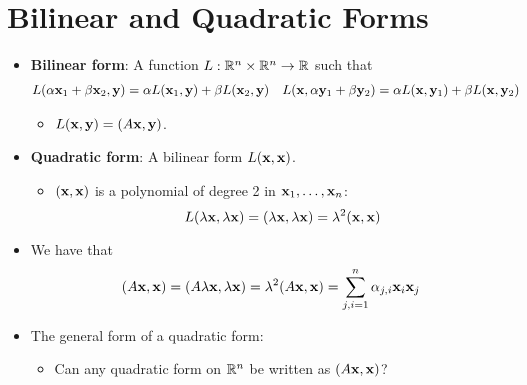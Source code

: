 \documentclass[../../notes.tex]{subfiles}
\begin{document}
\chapter{Bilinear and Quadratic Forms}
\begin{itemize}
    \item {}\textbf{Bilinear form}: A function $L:\mathbb{R}^n\times\mathbb{R}^n\to\mathbb{R}$ such that
    \begin{align*}
        L(\alpha\mathbf{x}_1+\beta\mathbf{x}_2,\mathbf{y}) &= \alpha L(\mathbf{x}_1,\mathbf{y})+\beta L(\mathbf{x}_2,\mathbf{y})&
        L(\mathbf{x},\alpha\mathbf{y}_1+\beta\mathbf{y}_2) &= \alpha L(\mathbf{x},\mathbf{y}_1)+\beta L(\mathbf{x},\mathbf{y}_2)
    \end{align*}
    \begin{itemize}
        \item $L(\mathbf{x},\mathbf{y})=(A\mathbf{x},\mathbf{y})$.
    \end{itemize}
    \item \textbf{Quadratic form}: A bilinear form $L(\mathbf{x},\mathbf{x})$.
    \begin{itemize}
        \item $(\mathbf{x},\mathbf{x})$ is a polynomial of degree 2 in $\mathbf{x}_1,\dots,\mathbf{x}_n$:
        \begin{equation*}
            L(\lambda\mathbf{x},\lambda\mathbf{x}) = (\lambda\mathbf{x},\lambda\mathbf{x}) = \lambda^2(\mathbf{x},\mathbf{x})
        \end{equation*}
    \end{itemize}
    \item We have that
    \begin{equation*}
        (A\mathbf{x},\mathbf{x}) = (A\lambda\mathbf{x},\lambda\mathbf{x}) = \lambda^2(A\mathbf{x},\mathbf{x}) = \sum_{j,i=1}^n\alpha_{j,i}\mathbf{x}_i\mathbf{x}_j
    \end{equation*}
    \item The general form of a quadratic form:
    \begin{itemize}
        \item Can any quadratic form on $\mathbb{R}^n$ be written as $(A\mathbf{x},\mathbf{x})$?
    \end{itemize}
\end{itemize}
\end{document}
